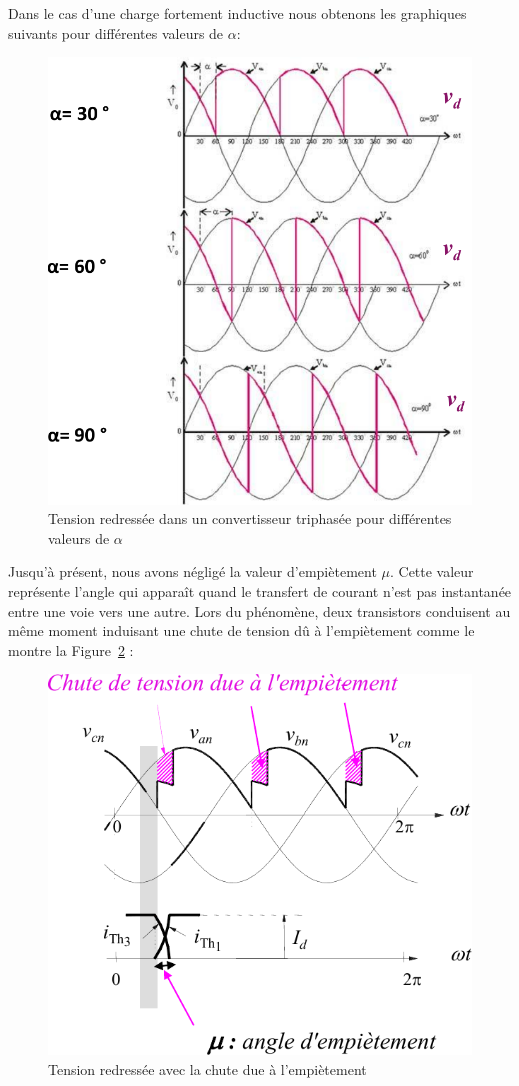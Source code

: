 \documentclass[a4paper, 11pt, openany, oneside, french]{article}
\begin{document}
 \clearpage
 Dans le cas d'une charge fortement inductive nous obtenons les graphiques suivants pour différentes valeurs de $\alpha$:
\begin{figure}[!ht]
    \centering
    \includegraphics[width=0.8\linewidth]{alpha_30_60_90}
    \caption{Tension redressée dans un convertisseur triphasée pour différentes valeurs de $\alpha$}
    \label{fig:tri_wave_var_alpha}
\end{figure}

Jusqu'à présent, nous avons négligé la valeur d'empiètement $\mu$. Cette valeur représente l'angle qui apparaît quand le transfert de courant n'est pas instantanée entre une voie vers une autre. Lors du phénomène, deux transistors conduisent au même moment induisant une chute de tension dû à l'empiètement comme le montre la Figure~\ref{fig:mu_empiet} :

\begin{figure}[!ht]
    \centering
    \includegraphics[width=0.8\linewidth]{empiet}
    \caption{Tension redressée avec la chute due à l'empiètement}
    \label{fig:mu_empiet}
\end{figure}
\end{document}
